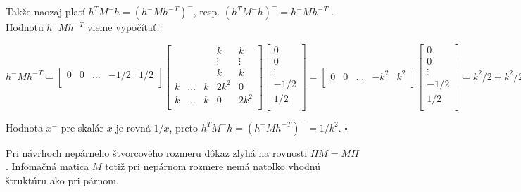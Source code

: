 \begin{dokaz}
Takže naozaj platí $h^T M^- h = (h^- M {h^-}^T)^-$, resp. $(h^T M^- h)^- = h^- M {h^-}^T$ . Hodnotu $h^- M {h^-}^T$ vieme vypočítať:

\begin{center}
$
h^- M {h^-}^T = 
\begin{bmatrix}
0 & 0 & \ldots & -1/2 & 1/2 \\
\end{bmatrix}
\begin{bmatrix}
&&& k & k \\
&&& \vdots & \vdots \\
&&& k & k \\
k & \ldots & k & 2k^2 & 0 \\
k & \ldots & k & 0 & 2k^2 \\
\end{bmatrix}
\begin{bmatrix}
0 \\
0 \\
\vdots \\
-1/2 \\
1/2 \\
\end{bmatrix}
=
\begin{bmatrix}
0 & 0 & \ldots & -k^2 & k^2 \\
\end{bmatrix}
\begin{bmatrix}
0 \\
0 \\
\vdots \\
-1/2 \\
1/2 \\
\end{bmatrix}
= k^2/2 + k^2/2 = k^2
$
\end{center}

Hodnota $x^-$ pre skalár $x$ je rovná $1/x$, preto $h^T M^- h = (h^- M {h^-}^T)^- = 1/k^2$. $\square$

\end{dokaz}

\begin{com}
Pri návrhoch nepárneho štvorcového rozmeru dôkaz zlyhá na rovnosti $HM = MH$.
Infomačná matica $M$ totiž pri nepárnom rozmere nemá natoľko vhodnú štruktúru ako pri párnom.
\end{com}
